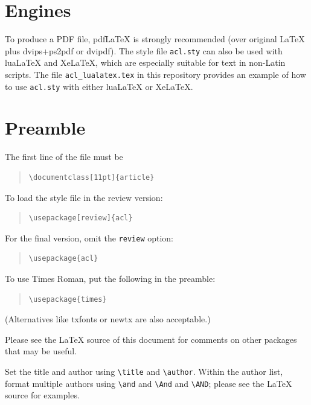 \documentclass[11pt]{article}
\begin{document}
\section{Engines}

To produce a PDF file, pdf\LaTeX{} is strongly recommended (over original \LaTeX{} plus dvips+ps2pdf or dvipdf).
The style file \texttt{acl.sty} can also be used with
lua\LaTeX{} and
Xe\LaTeX{}, which are especially suitable for text in non-Latin scripts.
The file \texttt{acl\_lualatex.tex} in this repository provides
an example of how to use \texttt{acl.sty} with either
lua\LaTeX{} or
Xe\LaTeX{}.

\section{Preamble}

The first line of the file must be
\begin{quote}
\begin{verbatim}
\documentclass[11pt]{article}
\end{verbatim}
\end{quote}

To load the style file in the review version:
\begin{quote}
\begin{verbatim}
\usepackage[review]{acl}
\end{verbatim}
\end{quote}
For the final version, omit the \verb|review| option:
\begin{quote}
\begin{verbatim}
\usepackage{acl}
\end{verbatim}
\end{quote}

To use Times Roman, put the following in the preamble:
\begin{quote}
\begin{verbatim}
\usepackage{times}
\end{verbatim}
\end{quote}
(Alternatives like txfonts or newtx are also acceptable.)

Please see the \LaTeX{} source of this document for comments on other packages that may be useful.

Set the title and author using \verb|\title| and \verb|\author|. Within the author list, format multiple authors using \verb|\and| and \verb|\And| and \verb|\AND|; please see the \LaTeX{} source for examples.
\end{document}
